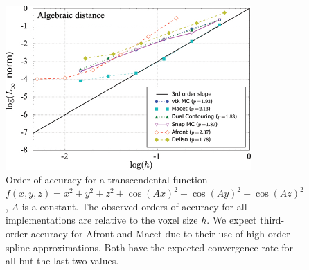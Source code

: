 

\begin{figure}
\centering
\includegraphics[width=0.84\linewidth,keepaspectratio=true]{chapter1/figures/afront_meshconv-onh.pdf}
  \caption{Order of accuracy for a transcendental function 
$f(x,y,z) = x^2 + y^2 + z^2 + \cos(Ax)^2 + \cos(Ay)^2 + \cos(Az)^2$, $A$ 
is a constant. The observed orders of accuracy for all implementations 
are relative to the voxel size $h$.
We expect third-order accuracy for 
Afront and Macet due to their use of high-order spline approximations.
Both have the expected convergence rate for all but the last two values.}
  \label{fig:afront-meshconvonh}
\end{figure}

